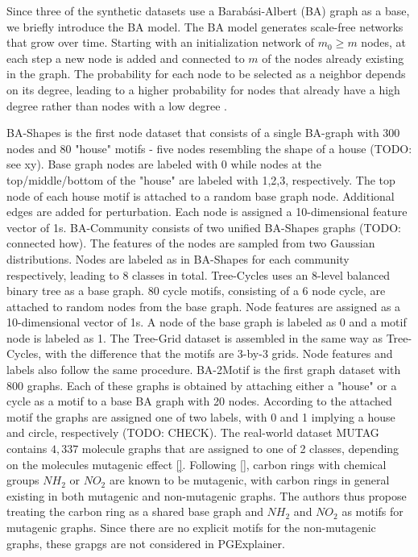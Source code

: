Since three of the synthetic datasets use a Barabási-Albert (BA) graph as a base, we briefly introduce the BA model. The BA model generates scale-free networks that grow over time. Starting with an initialization network of $m_0 \geq m$ nodes, at each step a new node is added and connected to $m$ of the nodes already existing in the graph. The probability for each node to be selected as a neighbor depends on its degree, leading to a higher probability for nodes that already have a high degree rather than nodes with a low degree \cite{albert2002statistical}.

BA-Shapes is the first node dataset that consists of a single BA-graph with 300 nodes and 80 "house" motifs - five nodes resembling the shape of a house (TODO: see xy). Base graph nodes are labeled with 0 while nodes at the top/middle/bottom of the "house" are labeled with 1,2,3, respectively. The top node of each house motif is attached to a random base graph node. Additional edges are added for perturbation. Each node is assigned a 10-dimensional feature vector of 1s.
BA-Community consists of two unified BA-Shapes graphs (TODO: connected how). The features of the nodes are sampled from two Gaussian distributions. Nodes are labeled as in BA-Shapes for each community respectively, leading to 8 classes in total.
Tree-Cycles uses an 8-level balanced binary tree as a base graph. 80 cycle motifs, consisting of a 6 node cycle, are attached to random nodes from the base graph. Node features are assigned as a 10-dimensional vector of 1s. A node of the base graph is labeled as 0 and a motif node is labeled as 1.
The Tree-Grid dataset is assembled in the same way as Tree-Cycles, with the difference that the motifs are 3-by-3 grids. Node features and labels also follow the same procedure.
BA-2Motif is the first graph dataset with 800 graphs. Each of these graphs is obtained by attaching either a "house" or a cycle as a motif to a base BA graph with 20 nodes. According to the attached motif the graphs are assigned one of two labels, with 0 and 1 implying a house and circle, respectively (TODO: CHECK).
The real-world dataset MUTAG contains $4,337$ molecule graphs that are assigned to one of 2 classes, depending on the molecules mutagenic effect \ref{}. Following \ref{}, carbon rings with chemical groups $NH_2$ or $NO_2$ are known to be mutagenic, with carbon rings in general existing in both mutagenic and non-mutagenic graphs. The authors thus propose treating the carbon ring as a shared base graph and $NH_2$ and $NO_2$ as motifs for mutagenic graphs. Since there are no explicit motifs for the non-mutagenic graphs, these grapgs are not considered in PGExplainer.

